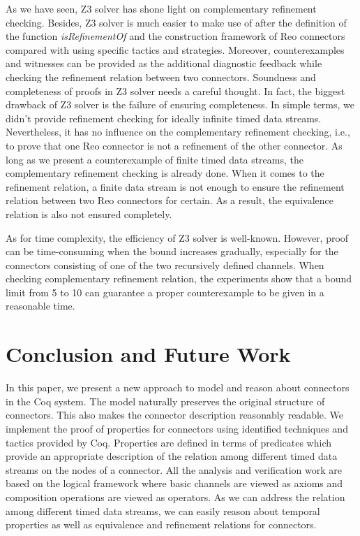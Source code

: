 \documentclass[3p,times]{elsarticle}
\begin{document}
As we have seen, Z3 solver has shone light on complementary refinement checking. Besides, Z3 solver is much easier to make use of after the definition of the function \emph{isRefinementOf} and the construction framework of Reo connectors compared with using specific tactics and strategies. Moreover, counterexamples and witnesses can be provided as the additional diagnostic feedback while checking the refinement relation between two connectors.
Soundness and completeness of proofs in Z3 solver needs a careful thought. In fact, the biggest drawback of Z3 solver is the failure of ensuring completeness. In simple terms, we didn't provide refinement checking for ideally infinite timed data streams. Nevertheless, it has no influence on the complementary refinement checking, i.e., to prove that one Reo connector is not a refinement of the other connector. As long as we present a counterexample of finite timed data streams, the complementary refinement checking is already done. When it comes to the refinement relation, a finite data stream is not enough to ensure the refinement relation between two Reo connectors for certain. As a result, the equivalence relation is also not ensured completely.

As for time complexity, the efficiency of Z3 solver is well-known. However, proof can be time-consuming when the bound increases gradually, especially for the connectors consisting of one of the two recursively defined channels. When checking complementary refinement relation, the experiments show that a bound limit from 5 to 10 can guarantee a proper counterexample to be given in a reasonable time.
\section{Conclusion and Future Work}\label{sec:conclusion}
In this paper, we present a new approach to model and reason about connectors in the Coq system. The model naturally
preserves the original structure of connectors. This also makes the connector description reasonably readable. We
implement the proof of properties for connectors using identified techniques and tactics provided by Coq. Properties are
defined in terms of predicates which provide an appropriate description of the relation among different
timed data streams on the nodes of a connector. All the analysis and verification work are based on the logical framework
where basic channels are viewed as axioms and composition operations are viewed as operators. As we can address
the relation among different timed data streams, we can easily reason about temporal properties as well as equivalence
and refinement relations for connectors.
\end{document}
